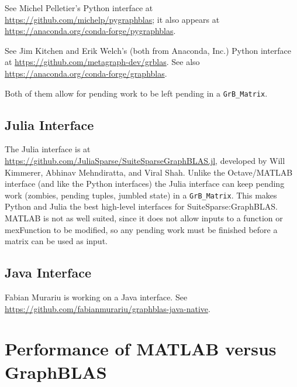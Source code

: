 \documentclass[12pt]{article}
\begin{document}
See Michel Pelletier's Python interface at
\url{https://github.com/michelp/pygraphblas};
it also appears at
\url{https://anaconda.org/conda-forge/pygraphblas}.

See Jim Kitchen and Erik Welch's (both from Anaconda, Inc.) Python interface at
\url{https://github.com/metagraph-dev/grblas}.
See also \\
\url{https://anaconda.org/conda-forge/graphblas}.

Both of them allow for pending work to be left pending in a \verb'GrB_Matrix'.

\subsection{Julia Interface}
\label{julia}

The Julia interface is at
\url{https://github.com/JuliaSparse/SuiteSparseGraphBLAS.jl}, developed by Will
Kimmerer, Abhinav Mehndiratta, and Viral Shah.  Unlike the Octave/MATLAB
interface (and like the Python interfaces) the Julia interface can keep pending
work (zombies, pending tuples, jumbled state) in a \verb'GrB_Matrix'.
This makes Python and Julia the best high-level interfaces for
SuiteSparse:GraphBLAS.  MATLAB is not as well suited, since it does not
allow inputs to a function or mexFunction to be modified, so any pending
work must be finished before a matrix can be used as input.

\subsection{Java Interface}
\label{java}

Fabian Murariu is working on a Java interface.
See \newline
\url{https://github.com/fabianmurariu/graphblas-java-native}.

\section{Performance of MATLAB versus GraphBLAS}
\label{matlab_performance}
\end{document}
